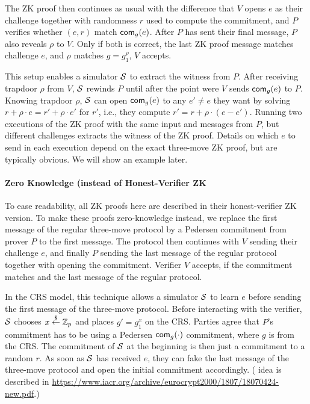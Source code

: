 The ZK proof then continues as usual with the difference that $V$
opens $e$ as their challenge together with randomness $r$ used to
compute the commitment, and $P$ verifies whether $(e,r)$ match
$\mathsf{com}_g(e)$.  After $P$ has sent their final message, $P$ also reveals
$\rho$ to $V$. Only if both is correct, the last ZK proof message
matches  challenge $e$, and $\rho$ matches $g=g_1^\rho$, $V$ accepts.

This setup enables a simulator ${\mathcal{S}}$ to extract the witness from
$P$. After receiving trapdoor $\rho$ from $V$, ${\mathcal{S}}$ rewinds $P$ until
after the point were $V$ sends $\mathsf{com}_g(e)$ to $P$. Knowing trapdoor
$\rho$, ${\mathcal{S}}$ can open $\mathsf{com}_g(e)$ to any $e'\neq{}e$ they want by
solving $r+\rho\cdot{}e=r'+\rho\cdot{}e'$ for $r'$, i.e., they compute
$r'=r+\rho\cdot{}(e-e')$. Running two executions of the ZK proof with the
same input and messages from $P$, but different challenges extracts
the witness of the ZK proof. Details on which $e$ to send in each
execution depend on the exact three-move ZK proof, but are typically
obvious. We will show an example later.

\paragraph{Zero Knowledge (instead of Honest-Verifier ZK}
To ease readability, all  ZK proofs here are described in their
honest-verifier ZK version. To make these proofs zero-knowledge
instead, we replace the first message of the regular three-move protocol by a
Pedersen commitment from prover $P$ to the first message. The protocol
then continues with $V$ sending their challenge $e$, and finally $P$
sending the last message of the regular protocol together with opening
the commitment. Verifier $V$ accepts, if the commitment matches and
the last message of the regular protocol.

In the CRS model, this technique allows a simulator ${\mathcal{S}}$ to learn
$e$ before sending the first message of the three-move
protocol. Before interacting with the verifier, ${\mathcal{S}}$ chooses
$x\stackrel{\$}{\leftarrow}\mathbb{Z}_p$ and places $g'=g_1^x$ on the CRS. Parties agree that $P$'s
commitment has to be using a Pedersen $\mathsf{com}_g(\cdot)$ commitment,
where $g$ is from the CRS. The commitment of ${\mathcal{S}}$ at the beginning
is then just a commitment to a random $r$. As soon as ${\mathcal{S}}$ has
received $e$, they can fake the last message of the three-move
protocol and open the initial commitment accordingly.
( idea is
described in
\url{https://www.iacr.org/archive/eurocrypt2000/1807/18070424-new.pdf}.)

